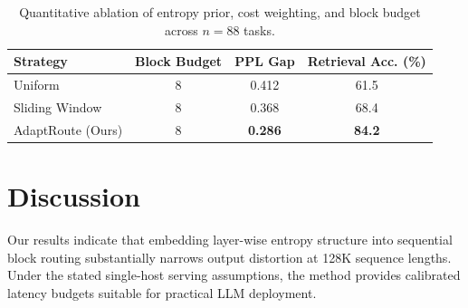 \documentclass[11pt]{article}
\begin{document}
\begin{table}[t]
\caption{Quantitative ablation of entropy prior, cost weighting, and block budget across $n = 88$ tasks.}
\label{tab:ablation}
\begin{tabular}{lccc}
\toprule
Strategy & Block Budget & PPL Gap & Retrieval Acc. (\%) \\
\midrule
Uniform & 8 & 0.412 & 61.5 \\
Sliding Window & 8 & 0.368 & 68.4 \\
AdaptRoute (Ours) & 8 & \textbf{0.286} & \textbf{84.2} \\
\bottomrule
\end{tabular}
\end{table}

\section{Discussion}
\label{sec:discussion}

Our results indicate that embedding layer-wise entropy structure into sequential block routing substantially narrows output distortion at 128K sequence lengths. Under the stated single-host serving assumptions, the method provides calibrated latency budgets suitable for practical LLM deployment.
\end{document}
